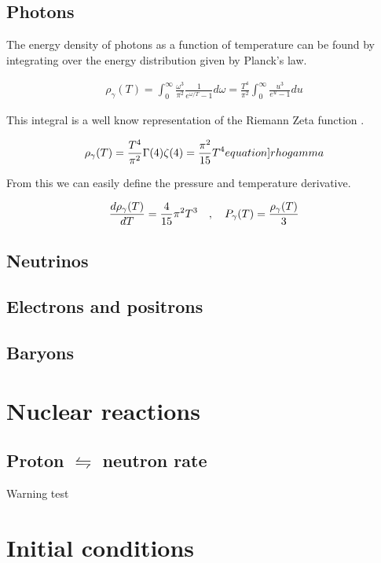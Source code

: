 \subsection{Photons}


The energy density of photons as a function of temperature can be found by integrating over the energy distribution given by Planck's law. 


\begin{align}
    \rho_\gamma(T)=\int_{0}^{\infty} \frac{\omega^3}{\pi^2}\frac{1}{e^{\omega/T}-1}d\omega =  \frac{T^4}{\pi^2}\int_{0}^{\infty}\frac{u^3}{e^{u}-1}du
\end{align}

This integral is a well know representation of the Riemann Zeta function \cite[\href{https://dlmf.nist.gov/25.5.E1}{(25.5.1)}]{NIST:DLMF}.

\begin{align}
    \rho_\gamma(T)=\frac{T^4}{\pi^2}\Gamma(4)\zeta(4)=\frac{\pi^2}{15}T^4
    \label[equation]{rhogamma}
\end{align}

From this we can easily define the pressure and temperature derivative.

\begin{align}
    \frac{d\rho_\gamma(T)}{dT}=\frac{4}{15}\pi^2T^3 \quad , \quad P_\gamma(T)=\frac{\rho_\gamma(T)}{3}
\end{align}




\subsection{Neutrinos}




\subsection{Electrons and positrons}

\subsection{Baryons}

\lipsum




\section{Nuclear reactions}
\label{sec:nucleartheory}

\subsection{Proton $\leftrightharpoons$ neutron rate}




Warning test

\lipsum

\section{Initial conditions}